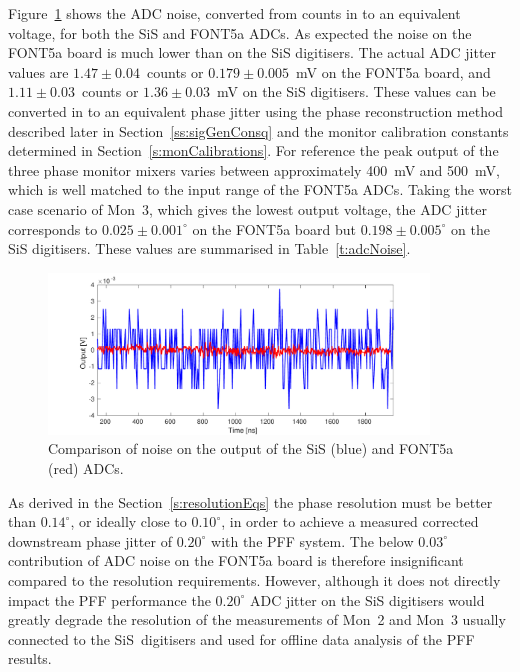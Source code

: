 Figure~\ref{f:digitiserNosie} shows the ADC noise, converted from counts in to an equivalent voltage, for both the SiS and FONT5a ADCs. As expected the noise on the FONT5a board is much lower than on the SiS digitisers. The actual ADC jitter values are \(1.47\pm0.04\)~counts or \(0.179\pm0.005\)~mV on the FONT5a board, and \(1.11\pm0.03\)~counts or \(1.36\pm0.03\)~mV on the SiS digitisers. These values can be converted in to an equivalent phase jitter using the phase reconstruction method described later in Section~\ref{ss:sigGenConsq} and the monitor calibration constants determined in Section~\ref{s:monCalibrations}. For reference the peak output of the three phase monitor mixers varies between approximately 400~mV and 500~mV, which is well matched to the input range of the FONT5a ADCs. Taking the worst case scenario of Mon~3, which gives the lowest output voltage, the ADC jitter corresponds to \(0.025\pm0.001^\circ\) on the FONT5a board but \(0.198\pm0.005^\circ\) on the SiS digitisers. These values are summarised in Table~\ref{t:adcNoise}.

\begin{figure}
  \centering
  \includegraphics[width=0.9\textwidth]{Figures/phaseMons/digitiserNosie}
  \caption{Comparison of noise on the output of the SiS (blue) and FONT5a (red) ADCs.}
  \label{f:digitiserNosie}
\end{figure}

As derived in the Section~\ref{s:resolutionEqs} the phase resolution must be better than \(0.14^\circ\), or ideally close to \(0.10^\circ\), in order to achieve a measured corrected downstream phase jitter of \(0.20^\circ\) with the PFF system. The below \(0.03^\circ\) contribution of ADC noise on the FONT5a board is therefore insignificant compared to the resolution requirements. However, although it does not directly impact the PFF performance the \(0.20^\circ\) ADC jitter on the SiS digitisers would greatly degrade the resolution of the measurements of Mon~2 and Mon~3 usually connected to the SiS~digitisers and used for offline data analysis of the PFF results. 

